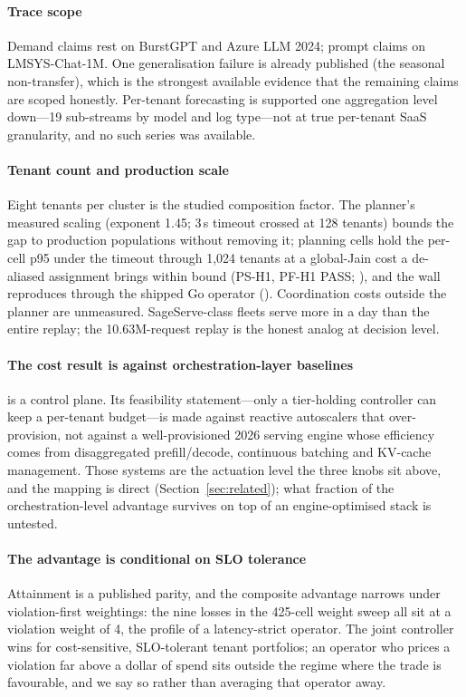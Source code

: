 \paragraph{Trace scope} Demand claims rest on BurstGPT and Azure LLM 2024;
prompt claims on LMSYS-Chat-1M. One generalisation failure is already
published (the seasonal non-transfer), which is the strongest available
evidence that the remaining claims are scoped honestly. Per-tenant
forecasting is supported one aggregation level down---19 sub-streams by
model and log type---not at true per-tenant SaaS granularity, and no such
series was available.

\paragraph{Tenant count and production scale} Eight tenants per cluster
is the studied composition factor. The planner's measured scaling
(exponent 1.45; 3\,s timeout crossed at 128 tenants) bounds the gap to
production populations without removing it; planning cells hold the
per-cell p95 under the timeout through 1,024 tenants at a global-Jain cost
a de-aliased assignment brings within bound (PS-H1, PF-H1 PASS;
), and the wall reproduces through the
shipped Go operator (). Coordination costs
outside the planner are unmeasured. SageServe-class fleets serve more in a
day than the entire replay; the 10.63M-request replay is the honest analog
at decision level.

\paragraph{The cost result is against orchestration-layer baselines}
\polyforge{} is a control plane. Its feasibility statement---only a
tier-holding controller can keep a per-tenant budget---is made against
reactive autoscalers that over-provision, not against a well-provisioned
2026 serving engine whose efficiency comes from disaggregated
prefill/decode, continuous batching and KV-cache management. Those systems
are the actuation level the three knobs sit above, and the mapping is
direct (Section~\ref{sec:related}); what fraction of the orchestration-level
advantage survives on top of an engine-optimised stack is untested.

\paragraph{The advantage is conditional on SLO tolerance} Attainment is
a published parity, and the composite advantage narrows under
violation-first weightings: the nine losses in the 425-cell weight sweep
all sit at a violation weight of 4, the profile of a latency-strict
operator. The joint controller wins for cost-sensitive, SLO-tolerant
tenant portfolios; an operator who prices a violation far above a dollar
of spend sits outside the regime where the trade is favourable, and we
say so rather than averaging that operator away.

